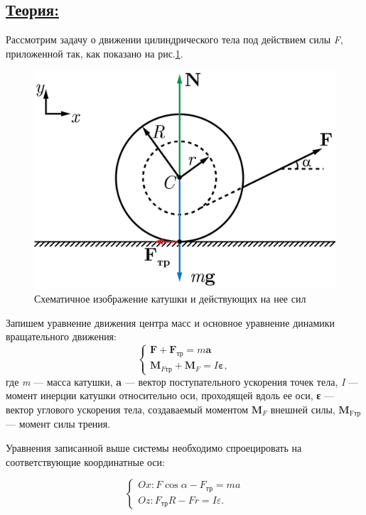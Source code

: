 \documentclass[14pt,a4paper,oneside]{extarticle}	%
\begin{document}
\subsection*{\underline{Теория:}}
Рассмотрим задачу о движении цилиндрического тела под действием силы \textit{F}, приложенной так, как показано на рис.\ref{roll-3}.

\begin{figure}[H] 
	\centering 		
	\includegraphics[width=0.6\linewidth]{roll-3.png} 
	\caption{Схематичное изображение катушки и действующих на нее сил}
	\label{roll-3}
\end{figure}

Запишем уравнение движения центра масс и основное уравнение динамики вращательного движения:
\begin{equation}\label{roll-eq1}
\begin{cases}
\textbf{F} + \textbf{F}_{\text{тр}} = m\textbf{a} \\
\textbf{M}_{F\text{тр}} + \textbf{M}_F= I\textbf{ε},
\end{cases}
\end{equation}
где \textit{m} — масса катушки, \textbf{a} — вектор поступательного ускорения точек тела, \textit{I} — момент инерции катушки относительно оси, проходящей вдоль ее оси, \textbf{ε} — вектор углового ускорения тела, создаваемый моментом $ \textbf{M}_F $ внешней силы, $ \textbf{M}_{\text{Fтр}} $ — момент силы трения.

Уравнения записанной выше системы необходимо спроецировать на соответствующие координатные оси:

\begin{equation}\label{roll-eq2}
\begin{cases}
Ox: F\cos\alpha - F_{\text{тр}} = ma \\
Oz: F_{\text{тр}}R - Fr= I \varepsilon.
\end{cases}
\end{equation}
\end{document}
